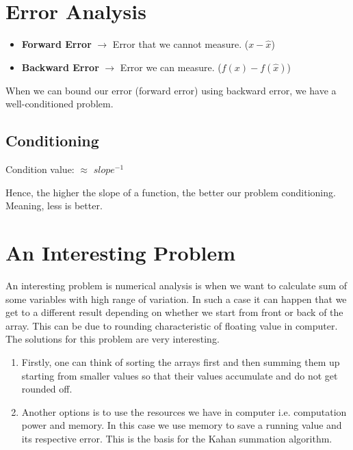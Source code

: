 \section*{Error Analysis}

\begin{itemize}
  \item \textbf{Forward Error} $\rightarrow$ Error that we cannot measure. ($x - \hat{x}$)
  \item \textbf{Backward Error} $\rightarrow$ Error we can measure. ($f(x) - f(\hat{x})$)
\end{itemize}

When we can bound our error (forward error) using backward error, we have a well-conditioned problem.

\subsection*{Conditioning}

Condition value: $\approx$ $slope^{-1}$

Hence, the higher the slope of a function, the better our problem conditioning. Meaning, less is better.

\section*{An Interesting Problem}

An interesting problem is numerical analysis is when we want to calculate sum of some variables with high range of variation. 
In such a case it can happen that we get to a different result depending on whether we start from front or back of the array.
This can be due to rounding characteristic of floating value in computer. The solutions for this problem are very interesting.
\begin{enumerate}
  \item Firstly, one can think of sorting the arrays first and then summing them up starting from smaller values so that their values accumulate
  and do not get rounded off.
  \item Another options is to use the resources we have in computer i.e. computation power and memory. In this case we use memory to save a running
  value and its respective error. This is the basis for the Kahan summation algorithm.
\end{enumerate}
